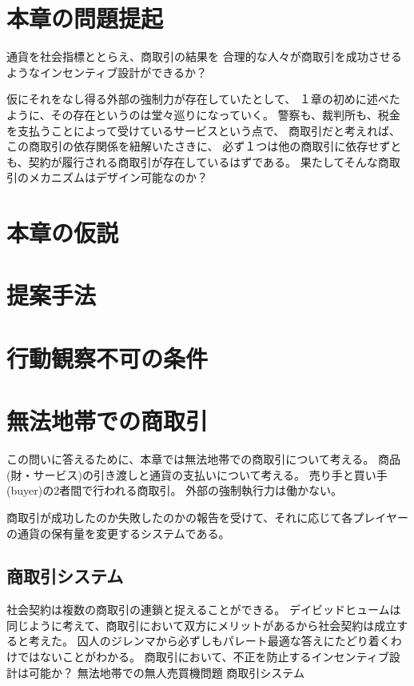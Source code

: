 \section{本章の問題提起}
通貨を社会指標ととらえ、商取引の結果を
合理的な人々が商取引を成功させるようなインセンティブ設計ができるか？

仮にそれをなし得る外部の強制力が存在していたとして、
１章の初めに述べたように、その存在というのは堂々巡りになっていく。
警察も、裁判所も、税金を支払うことによって受けているサービスという点で、
商取引だと考えれば、この商取引の依存関係を紐解いたさきに、
必ず１つは他の商取引に依存せずとも、契約が履行される商取引が存在しているはずである。
果たしてそんな商取引のメカニズムはデザイン可能なのか？

\section{本章の仮説}

\section{提案手法}

\section{行動観察不可の条件}

\section{無法地帯での商取引}
この問いに答えるために、本章では無法地帯での商取引について考える。
商品(財・サービス)の引き渡しと通貨の支払いについて考える。
売り手と買い手(buyer)の2者間で行われる商取引。
外部の強制執行力は働かない。

商取引が成功したのか失敗したのかの報告を受けて、それに応じて各プレイヤーの通貨の保有量を変更するシステムである。

\subsection{商取引システム}


% 
% 
% 





社会契約は複数の商取引の連鎖と捉えることができる。
デイビッドヒュームは同じように考えて、商取引において双方にメリットがあるから社会契約は成立すると考えた。
囚人のジレンマから必ずしもパレート最適な答えにたどり着くわけではないことがわかる。
商取引において、不正を防止するインセンティブ設計は可能か？
無法地帯での無人売買機問題
商取引システム